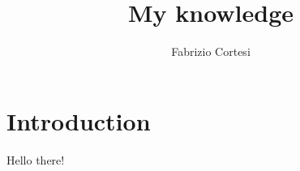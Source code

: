 \documentclass{article}
\title{My knowledge}
\author{Fabrizio Cortesi}
\begin{document}
\maketitle

\section*{Introduction}

Hello there!
\end{document}
